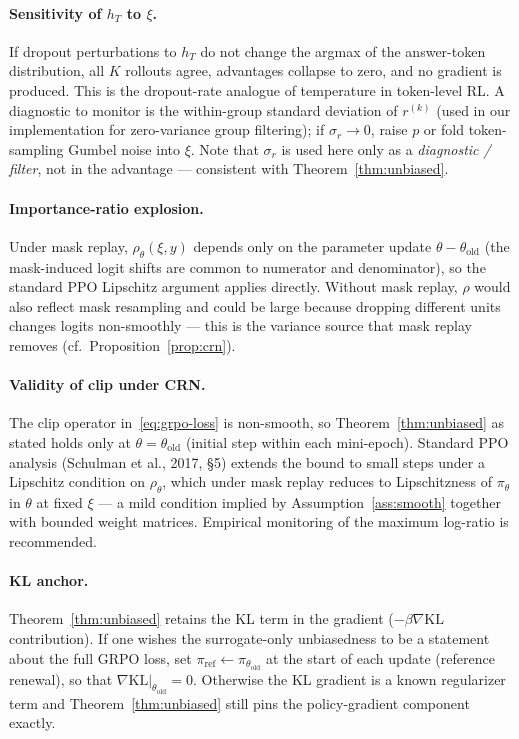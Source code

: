 \documentclass[11pt]{article}
\theoremstyle{definition}
\theoremstyle{remark}
\newcommand{\KL}{\mathrm{KL}}
\newcommand{\old}{\mathrm{old}}
\begin{document}
\paragraph{Sensitivity of $h_T$ to $\xi$.}
If dropout perturbations to $h_T$ do not change the argmax of the
answer-token distribution, all $K$ rollouts agree, advantages collapse to
zero, and no gradient is produced.  This is the dropout-rate analogue of
temperature in token-level RL.  A diagnostic to monitor is the
within-group standard deviation of $r^{(k)}$ (used in our implementation
for zero-variance group filtering); if $\sigma_r \to 0$, raise $p$ or fold
token-sampling Gumbel noise into $\xi$.  Note that $\sigma_r$ is used here
only as a \emph{diagnostic / filter}, not in the advantage --- consistent
with Theorem~\ref{thm:unbiased}.

\paragraph{Importance-ratio explosion.}
Under mask replay, $\rho_\theta(\xi,y)$ depends only on the parameter
update $\theta - \theta_\old$ (the mask-induced logit shifts are common
to numerator and denominator), so the standard PPO Lipschitz argument
applies directly.  Without mask replay, $\rho$ would also reflect mask
resampling and could be large because dropping different units changes
logits non-smoothly --- this is the variance source that mask replay
removes (cf.\ Proposition~\ref{prop:crn}).

\paragraph{Validity of clip under CRN.}
The clip operator in~\eqref{eq:grpo-loss} is non-smooth, so
Theorem~\ref{thm:unbiased} as stated holds only at $\theta = \theta_\old$
(initial step within each mini-epoch).  Standard PPO analysis (Schulman
et al., 2017, \S 5) extends the bound to small steps under a Lipschitz
condition on $\rho_\theta$, which under mask replay reduces to
Lipschitzness of $\pi_\theta$ in $\theta$ at fixed $\xi$ --- a mild
condition implied by Assumption~\ref{ass:smooth} together with bounded
weight matrices.  Empirical monitoring of the maximum log-ratio is
recommended.

\paragraph{KL anchor.}
Theorem~\ref{thm:unbiased} retains the KL term in the gradient
($-\beta\nabla\KL$ contribution).  If one wishes the surrogate-only
unbiasedness to be a statement about the full GRPO loss, set
$\pi_{\mathrm{ref}} \gets \pi_{\theta_\old}$ at the start of each update
(reference renewal), so that $\nabla\KL|_{\theta_\old} = 0$.  Otherwise
the KL gradient is a known regularizer term and Theorem~\ref{thm:unbiased}
still pins the policy-gradient component exactly.
\end{document}
